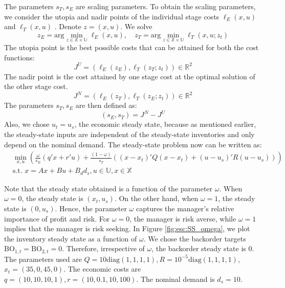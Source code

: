 \documentclass{elsarticle}
\newcommand{\BO}{\textrm{BO}}
\newcommand{\diag}{\text{diag}}
\theoremstyle{definition}
\begin{document}
The parameters $s_T,s_E$ are scaling parameters. To obtain the scaling
parameters, we consider the utopia and nadir points of the individual
stage costs $\ell_E(x,u)$ and $\ell_T(x,u)$
\cite{kim:weck:2005}. Denote $z=(x,u)$. We solve
\[ z_E = \text{arg}\min_{z \in \mathbb{X} \times \mathbb{U}}{\ell_E(x,u)}, \quad z_T = \text{arg}\min_{z \in \mathbb{X} \times
  \mathbb{U}}{\ell_T(x,u;z_t)} \]
The utopia point is the best possible costs that can be attained for
both the cost functions:
\[J^U = (\ell_E(z_E),\ell_T(z_T;z_t))\in
\mathbb{R}^2\] 
The nadir point is the cost attained by one stage cost at the optimal
solution of the other stage cost.
\[J^N = (\ell_E(z_T),\ell_T(z_E;z_t))\in
\mathbb{R}^2 \] 
The parameters $s_T,s_E$ are then defined as:
\[ (s_E,s_T) = J^N-J^U \]
Also, we chose $u_t = u_s$, the economic steady state, because as
mentioned earlier, the steady-state inputs are independent of the
steady-state inventories and only depend on the nominal demand.
The steady-state problem now can be written as:
\begin{align}
\label{eq:esc:SSMulti}
&\min_{x,u}{}(\frac{\omega}{s_E} (q'x+r'u) +
\frac{(1-\omega)}{s_T}((x-x_t)'Q(x-x_{t})+(u-u_s)'R(u-u_s)))
\nonumber\\
&\text{s.t.~} x=Ax+Bu+B_dd_s, u \in \mathbb{U}, x \in \mathbb{X} 
\end{align}

Note that the steady state obtained is a function of the parameter $\omega$.
When $\omega = 0$, the steady state is $(x_t,u_s)$. On the other hand,
when $\omega = 1$, the steady state is $({0},u_s)$. Hence,
the parameter $\omega$ captures the manager's relative importance
of profit and risk. For $\omega = 0$, 
the manager is risk averse, while $\omega = 1$ implies that the
manager is risk seeking. In Figure \ref{fig:esc:SS_omega}, we plot
the inventory steady state as a function of $\omega$. We chose the
backorder targets $\BO_{1,t} = \BO_{2,t} = 0$. Therefore, irrespective
of $\omega$, the backorder steady state is $0$. The parameters used
are  $ Q =
10\diag{(1,1,1,1)}, R = 10^{-5}\diag{(1,1,1,1)}$, $x_{t}
= (35,0,45,0)$. The economic costs are $q = (10,10,10,1), r =
(10,0.1,10,100)$. The nominal demand is $d_s = 10$. 
\end{document}

